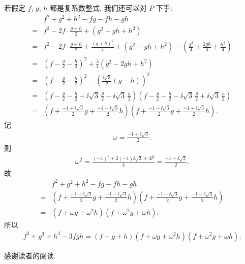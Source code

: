 \begin{example}
    若假定 $f$, $g$, $h$ 都是复系数整式, 我们还可以对 $P$ 下手:
    \begin{align*}
             & f^2 + g^2 + h^2 - fg - fh - gh                                                                                                                                                                                \\
        = {} & f^2 - 2f \cdot \frac{g+h}{2} + (g^2 - gh + h^2)                                                                                                                                                               \\
        = {} & f^2 - 2f \cdot \frac{g+h}{2} + \frac{(g+h)^2}{4} + (g^2 - gh + h^2) - \left( \frac{g^2}{4} + \frac{2gh}{4} + \frac{h^2}{4} \right)                                                                            \\
        = {} & \left( f - \frac{g}{2} - \frac{h}{2} \right)^2 + \frac{3}{4} (g^2 - 2gh + h^2)                                                                                                                                \\
        = {} & \left( f - \frac{g}{2} - \frac{h}{2} \right)^2 - \left( \frac{\ii \sqrt{3}}{2} (g - h) \right)^2                                                                                                              \\
        = {} & \left( f - \frac{g}{2} - \frac{h}{2} + \ii \sqrt{3}\, \frac{g}{2} - \ii \sqrt{3}\, \frac{h}{2} \right) \left( f - \frac{g}{2} - \frac{h}{2} - \ii \sqrt{3}\, \frac{g}{2} + \ii \sqrt{3}\, \frac{h}{2} \right) \\
        = {} & \left( f + \frac{-1 + \ii \sqrt{3}}{2} g + \frac{-1 - \ii \sqrt{3}}{2} h \right) \left( f + \frac{-1 - \ii \sqrt{3}}{2} g + \frac{-1 + \ii \sqrt{3}}{2} h \right).
    \end{align*}
    记
    \begin{align*}
        \omega = \frac{-1 + \ii \sqrt{3}}{2}.
    \end{align*}
    则
    \begin{align*}
        \omega^2 = \frac{(-1)^2 + 2(-1) \ii \sqrt{3} + 3\ii^2}{4} = \frac{-1 - \ii \sqrt{3}}{2}.
    \end{align*}
    故
    \begin{align*}
             & f^2 + g^2 + h^2 - fg - fh - gh                                                                                                                                    \\
        = {} & \left( f + \frac{-1 + \ii \sqrt{3}}{2} g + \frac{-1 - \ii \sqrt{3}}{2} h \right) \left( f + \frac{-1 - \ii \sqrt{3}}{2} g + \frac{-1 + \ii \sqrt{3}}{2} h \right) \\
        = {} & (f + \omega g + \omega^2 h) (f + \omega^2 g + \omega h).
    \end{align*}
    所以
    \begin{align*}
        f^3 + g^3 + h^3 - 3fgh = (f + g + h) (f + \omega g + \omega^2 h) (f + \omega^2 g + \omega h).
    \end{align*}
\end{example}

感谢读者的阅读.
